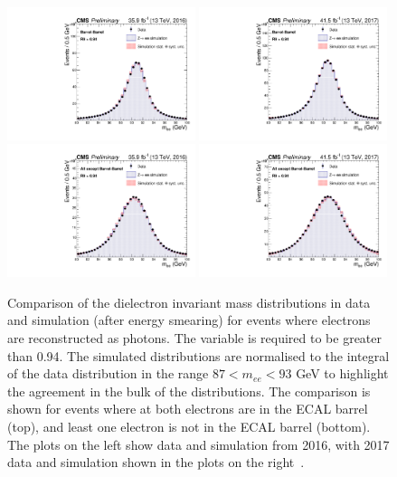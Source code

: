 \begin{figure}[h!]
  \centering
  \includegraphics[width=0.49\textwidth]{Figures/Objects/meeBarrel2016}
  \includegraphics[width=0.49\textwidth]{Figures/Objects/meeBarrel2017} \\
  \includegraphics[width=0.49\textwidth]{Figures/Objects/meeEndcap2016}
  \includegraphics[width=0.49\textwidth]{Figures/Objects/meeEndcap2017}
  \caption[Dielectron invariant mass distributions.]
  {
    Comparison of the dielectron invariant mass distributions in data and simulation
    (after energy smearing) for \Zee
    events where electrons are reconstructed as photons.
    The \RNINE variable is required to be greater than 0.94.
    The simulated distributions are
    normalised to the integral of the data distribution 
    in the range $87 < m_{ee} < 93$ GeV to highlight
    the agreement in the bulk of the distributions.
    The comparison is shown for events where at both electrons are in the ECAL barrel (top), 
    and least one electron is not in the ECAL barrel (bottom).
    The plots on the left show data and simulation from 2016, 
    with 2017 data and simulation shown in the plots on the right~\cite{HIG-18-029}.
  }
  \label{fig:obj_mee}
\end{figure}

